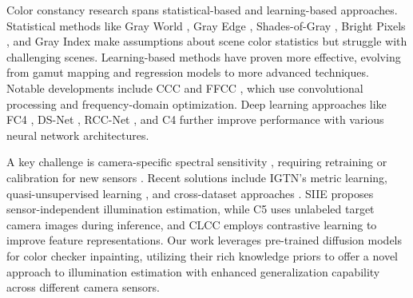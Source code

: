 % 
Color constancy research spans statistical-based and learning-based approaches. Statistical methods like Gray World \cite{buchsbaum1980spatial}, Gray Edge \cite{WeijerGG07}, Shades-of-Gray \cite{finlayson2004shades}, Bright Pixels \cite{joze2012role}, and Gray Index \cite{qian2019finding} make assumptions about scene color statistics but struggle with challenging scenes.
% 
Learning-based methods have proven more effective, evolving from gamut mapping \cite{barnard2000improvements,chakrabarti2011color} and regression models \cite{funt2004estimating} to more advanced techniques. Notable developments include CCC \cite{barron2015convolutional} and FFCC \cite{barron2017fast}, which use convolutional processing and frequency-domain optimization. Deep learning approaches like FC4 \cite{hu2017fc4}, DS-Net \cite{shi2016deep}, RCC-Net \cite{8237844}, and C4 \cite{yu2020cascading} further improve performance with various neural network architectures. 

A key challenge is camera-specific spectral sensitivity \cite{afifi2019sensor,gao2017improving}, requiring retraining or calibration for new sensors \cite{liba2019handheld}. Recent solutions include IGTN's \cite{igtn} metric learning, quasi-unsupervised learning \cite{bianco2019quasi}, and cross-dataset approaches \cite{Koskinen2020CrossdatasetCC}. SIIE \cite{afifi2019sensor} proposes sensor-independent illumination estimation, while C5 \cite{afifi2021cross} uses unlabeled target camera images during inference, and CLCC \cite{lo2021clcc} employs contrastive learning to improve feature representations. Our work leverages pre-trained diffusion models for color checker inpainting, utilizing their rich knowledge priors to offer a novel approach to illumination estimation with enhanced generalization capability across different camera sensors.

